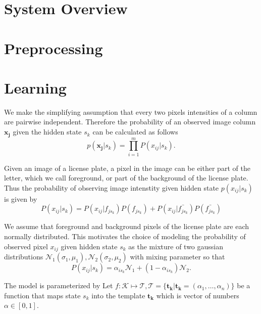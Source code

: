 \documentclass[a4paper,12pt]{article}
\newcounter{jpNoteCounter}
\newcommand{\jpnote}[1]{{\scriptsize  \color{Cblue} $\blacksquare$ \refstepcounter{jpNoteCounter}\textsf{[JP]$_{\arabic{jpNoteCounter}}$:{#1}}}}
\renewcommand{\jpnote}[1]{}
\begin{document}
\jpnote{Need to put something here about going from hidden states to
  characters}

\section{System Overview}

\section{Preprocessing}

\section{Learning}
We make the simplifying assumption that every two pixels intensities
of a column are pairwise independent. Therefore the probability of an
observed image column $\mathbf{x_j}$ given the hidden state $s_k$ can
be calculated as follows \[p(\mathbf{x_j}|s_k) = \prod_{i=1}^{m}
P(x_{ij}|s_k).\]

Given an image of a license plate, a pixel in the image can be either
part of the letter, which we call foreground, or part of the
background of the license plate.  Thus the probability of observing
image intenstity given hidden state $p(x_{ij}|s_k)$ is given by
\begin{equation}
  P(x_{ij}|s_k)=P(x_{ij}|f_{js_k})P(f_{js_k})+P(x_{ij}|\bar{f_{js_k}})P(\bar{f_{js_k}})
\end{equation}
  
  
We assume that foreground and background pixels of the license plate
are each normally distributed.  This motivates the choice of modeling
the probability of observed pixel $x_{ij}$ given hidden state $s_k$ as
the mixture of two gaussian distributions $\mathcal{N}_1(\sigma_1,
\mu_1), \mathcal{N}_2(\sigma_2, \mu_2)$ with mixing parameter so that
\begin{equation}
  P(x_{ij} | s_k) = \alpha_{is_k} \mathcal{N}_1 + (1-\alpha_{is_k})
  \mathcal{N}_2 .
\end{equation}

\jpnote{need to talk about how the model enables different
  distributions for each row of each hidden state}

  
The model is parameterized by Let $f : \mathcal{K} \mapsto
\mathcal{T}, \mathcal{T} = \{ \mathbf{t_k} | \mathbf{t_k} = (\alpha_1
, \dots , \alpha_n)\}$ be a function that maps state $s_k$ into the
template $\mathbf{t_k}$ which is vector of numbers $\alpha \in [0,
1]$.
\end{document}
